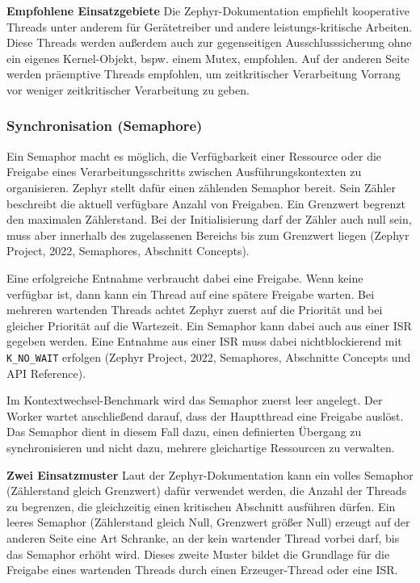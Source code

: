 \textbf{Empfohlene Einsatzgebiete} Die Zephyr-Dokumentation empfiehlt kooperative Threads unter anderem f{\"u}r Ger{\"a}tetreiber und andere leistungs-kritische Arbeiten. Diese Threads werden au{\ss}erdem auch zur gegenseitigen Ausschlusssicherung ohne ein eigenes Kernel-Objekt, bspw. einem Mutex, empfohlen. Auf der anderen Seite werden pr{\"a}emptive Threads empfohlen, um zeitkritischer Verarbeitung Vorrang vor weniger zeitkritischer Verarbeitung zu geben.

\subsubsection{Synchronisation (Semaphore)}
Ein Semaphor macht es m{\"o}glich, die Verf{\"u}gbarkeit einer Ressource oder die Freigabe eines Verarbeitungsschritts zwischen Ausf{\"u}hrungskontexten zu organisieren. Zephyr stellt daf{\"u}r einen z{\"a}hlenden Semaphor bereit. Sein Z{\"a}hler beschreibt die aktuell verf{\"u}gbare Anzahl von Freigaben. Ein Grenzwert begrenzt den maximalen Z{\"a}hlerstand. Bei der Initialisierung darf der Z{\"a}hler auch null sein, muss aber innerhalb des zugelassenen Bereichs bis zum Grenzwert liegen (Zephyr Project, 2022, \glqq{}Semaphores\grqq{}, Abschnitt \glqq{}Concepts\grqq{}).

Eine erfolgreiche Entnahme verbraucht dabei eine Freigabe. Wenn keine verf{\"u}gbar ist, dann kann ein Thread auf eine sp{\"a}tere Freigabe warten. Bei mehreren wartenden Threads achtet Zephyr zuerst auf die Priorit{\"a}t und bei gleicher Priorit{\"a}t auf die Wartezeit. Ein Semaphor kann dabei auch aus einer ISR gegeben werden. Eine Entnahme aus einer ISR muss dabei nichtblockierend mit \lstinline[style=codeinline]|K_NO_WAIT| erfolgen (Zephyr Project, 2022, \glqq{}Semaphores\grqq{}, Abschnitte \glqq{}Concepts\grqq{} und \glqq{}API Reference\grqq{}).

Im Kontextwechsel-Benchmark wird das Semaphor zuerst leer angelegt. Der Worker wartet anschlie{\ss}end darauf, dass der Hauptthread eine Freigabe ausl{\"o}st. Das Semaphor dient in diesem Fall dazu, einen definierten {\"U}bergang zu synchronisieren und nicht dazu, mehrere gleichartige Ressourcen zu verwalten.

\textbf{Zwei Einsatzmuster} Laut der Zephyr-Dokumentation kann ein \glqq{}volles\grqq{} Semaphor (Z{\"a}hlerstand gleich Grenzwert) daf{\"u}r verwendet werden, die Anzahl der Threads zu begrenzen, die gleichzeitig einen kritischen Abschnitt ausf{\"u}hren d{\"u}rfen. Ein \glqq{}leeres\grqq{} Semaphor (Z{\"a}hlerstand gleich Null, Grenzwert gr{\"o}{\ss}er Null) erzeugt auf der anderen Seite eine Art Schranke, an der kein wartender Thread vorbei darf, bis das Semaphor erh{\"o}ht wird. Dieses zweite Muster bildet die Grundlage f{\"u}r die Freigabe eines wartenden Threads durch einen Erzeuger-Thread oder eine ISR.

